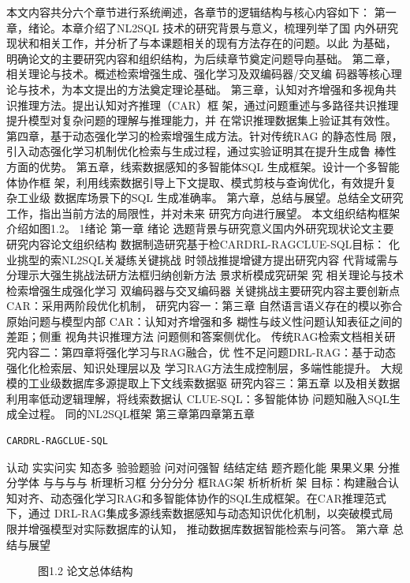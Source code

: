 \documentclass[12pt,a4paper,openright,UTF8]{ctexbook}
\begin{document}
本文内容共分六个章节进行系统阐述，各章节的逻辑结构与核心内容如下： 第一章，绪论。本章介绍了NL2SQL 技术的研究背景与意义，梳理列举了国 内外研究现状和相关工作，并分析了与本课题相关的现有方法存在的问题。以此 为基础，明确论文的主要研究内容和组织结构，为后续章节奠定问题导向基础。 第二章，相关理论与技术。概述检索增强生成、强化学习及双编码器/交叉编 码器等核心理论与技术，为本文提出的方法奠定理论基础。 第三章，认知对齐增强和多视角共识推理方法。提出认知对齐推理（CAR）框 架，通过问题重述与多路径共识推理提升模型对复杂问题的理解与推理能力，并 在常识推理数据集上验证其有效性。 第四章，基于动态强化学习的检索增强生成方法。针对传统RAG 的静态性局 限，引入动态强化学习机制优化检索与生成过程，通过实验证明其在提升生成鲁 棒性方面的优势。 第五章，线索数据感知的多智能体SQL 生成框架。设计一个多智能体协作框 架，利用线索数据引导上下文提取、模式剪枝与查询优化，有效提升复杂工业级 数据库场景下的SQL 生成准确率。 第六章，总结与展望。总结全文研究工作，指出当前方法的局限性，并对未来 研究方向进行展望。 本文组织结构框架介绍如图1.2。 1绪论 第一章 绪论 选题背景与研究意义国内外研究现状论文主要研究内容论文组织结构 数据制造研究基于检CARDRL-RAGCLUE-SQL目标： 化业挑型的索NL2SQL关凝练关键挑战 时领战推提增键方提出研究内容 代背域需与分理示大强生挑战法研方法框归纳创新方法 景求析模成究研架 究 相关理论与技术 检索增强生成强化学习 双编码器与交叉编码器 关键挑战主要研究内容主要创新点 CAR：采用两阶段优化机制， 研究内容一：第三章 自然语言语义存在的模以弥合原始问题与模型内部 CAR：认知对齐增强和多 糊性与歧义性问题认知表征之间的差距；侧重 视角共识推理方法 问题侧和答案侧优化。 传统RAG检索文档相关研究内容二：第四章将强化学习与RAG融合，优 性不足问题DRL-RAG：基于动态强化化检索层、知识处理层以及 学习RAG方法生成控制层，多端性能提升。 大规模的工业级数据库多源提取上下文线索数据驱 研究内容三：第五章 以及相关数据利用率低动逻辑理解，将线索数据认 CLUE-SQL：多智能体协 问题知融入SQL生成全过程。 同的NL2SQL框架 第三章第四章第五章

\begin{lstlisting}
CARDRL-RAGCLUE-SQL
\end{lstlisting}
认动 实实问实 知态多 验验题验 问对问强智 结结定结 题齐题化能 果果义果 分推分学体 与与与与 析理析习框 分分分分 框RAG架 析析析析 架 目标：构建融合认知对齐、动态强化学习RAG和多智能体协作的SQL生成框架。在CAR推理范式下，通过 DRL-RAG集成多源线索数据感知与动态知识优化机制，以突破模式局限并增强模型对实际数据库的认知， 推动数据库数据智能检索与问答。 第六章 总结与展望

\begin{figure}[htbp]
\centering
{}
\caption{图1.2 论文总体结构}
\end{figure}
\end{document}
